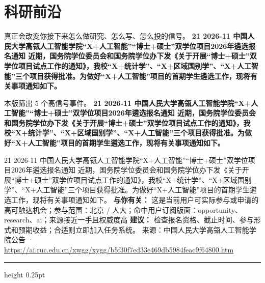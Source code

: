 \documentclass[10.5pt]{ctexart}
\begin{document}
\section*{科研前沿}
{\color{ormuted} 真正会改变你接下来怎么做研究、怎么写、怎么投的信号。}
\vspace{2mm}
{\LARGE\bfseries 21 2026-11 中国人民大学高瓴人工智能学院“X+人工智能”“博士+硕士”双学位项目2026年遴选报名通知 近期，国务院学位委员会和国务院学位办下发《关于开展“博士+硕士”双学位项目试点工作的通知》，我校“X+统计学”、“X+区域国别学”、“X+人工智能”三个项目获得批准。为做好“X+人工智能”项目的首期学生遴选工作，现将有关事项通知如下。}\par
\vspace{1mm}
{\color{ormuted} 本版筛出 5 个高信号事件。}
\vspace{3mm}
{\Large\bfseries 21 2026-11 中国人民大学高瓴人工智能学院“X+人工智能”“博士+硕士”双学位项目2026年遴选报名通知 近期，国务院学位委员会和国务院学位办下发《关于开展“博士+硕士”双学位项目试点工作的通知》，我校“X+统计学”、“X+区域国别学”、“X+人工智能”三个项目获得批准。为做好“X+人工智能”项目的首期学生遴选工作，现将有关事项通知如下。}\par
21 2026-11 中国人民大学高瓴人工智能学院“X+人工智能”“博士+硕士”双学位项目2026年遴选报名通知 近期，国务院学位委员会和国务院学位办下发《关于开展“博士+硕士”双学位项目试点工作的通知》，我校“X+统计学”、“X+区域国别学”、“X+人工智能”三个项目获得批准。为做好“X+人工智能”项目的首期学生遴选工作，现将有关事项通知如下。
\textbf{与你有关：} 这是当前用户可实际参与或申请的高可触达机会；参与范围：北京 / 人大；命中用户订阅版面：opportunity、research、ai；来源接近一手且权威度高
\textbf{建议：} 检查报名资格、截止时间、参与形式和预期收益；合适则立即加入任务系统。
{\footnotesize\color{ormuted} 来源：中国人民大学高瓴人工智能学院公告 · \url{https://ai.ruc.edu.cn/xwgg/xygg/b5f30f7ed33e469db5984feac9f64800.htm}}
\vspace{4mm}
\hrule height 0.25pt
\vspace{3mm}
\end{document}
